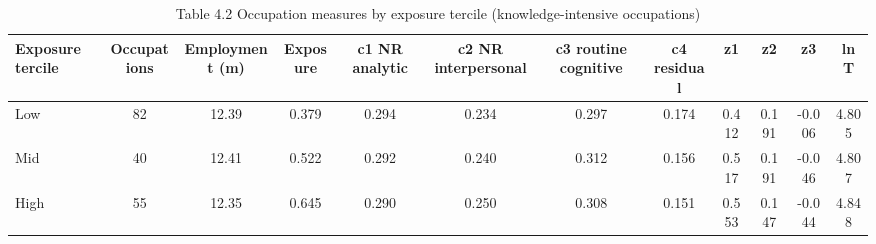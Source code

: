 \begin{table}[htbp]\centering
\caption{Table 4.2 Occupation measures by exposure tercile (knowledge-intensive occupations)}
\begin{tabular}{lccccccccccc}
\toprule
Exposure tercile & Occupations & Employment (m) & Exposure & c1 NR analytic & c2 NR interpersonal & c3 routine cognitive & c4 residual & z1 & z2 & z3 & ln T \\
\midrule
Low & 82 & 12.39 & 0.379 & 0.294 & 0.234 & 0.297 & 0.174 & 0.412 & 0.191 & -0.006 & 4.805 \\
Mid & 40 & 12.41 & 0.522 & 0.292 & 0.240 & 0.312 & 0.156 & 0.517 & 0.191 & -0.046 & 4.807 \\
High & 55 & 12.35 & 0.645 & 0.290 & 0.250 & 0.308 & 0.151 & 0.553 & 0.147 & -0.044 & 4.848 \\
\bottomrule
\end{tabular}
\par\vspace{2pt}{\footnotesize Means weighted by OEWS employment. Terciles are employment-weighted thirds of the knowledge-intensive occupations (step 03).}
\end{table}
